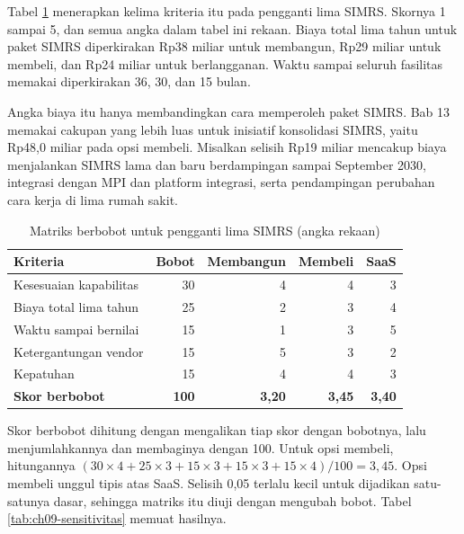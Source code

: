 Tabel \ref{tab:ch09-matriks-sumber} menerapkan kelima kriteria itu pada
pengganti lima SIMRS. Skornya 1 sampai 5, dan semua angka dalam tabel ini
rekaan. Biaya total lima tahun untuk paket SIMRS diperkirakan Rp38 miliar untuk
membangun, Rp29 miliar untuk membeli, dan Rp24 miliar untuk berlangganan. Waktu
sampai seluruh fasilitas memakai diperkirakan 36, 30, dan 15 bulan.

Angka biaya itu hanya membandingkan cara memperoleh paket SIMRS. Bab 13 memakai
cakupan yang lebih luas untuk inisiatif konsolidasi SIMRS, yaitu Rp48,0 miliar
pada opsi membeli. Misalkan selisih Rp19 miliar mencakup biaya menjalankan SIMRS lama dan
baru berdampingan sampai September 2030, integrasi dengan MPI dan platform
integrasi, serta pendampingan perubahan cara kerja di lima rumah sakit.

\begin{table}[!htb]
  \centering
  \caption{Matriks berbobot untuk pengganti lima SIMRS (angka rekaan)}
  \label{tab:ch09-matriks-sumber}
  \small
  \begin{tabularx}{\textwidth}{Xrrrr}
    \hline
    \textbf{Kriteria} & \textbf{Bobot} & \textbf{Membangun} & \textbf{Membeli} & \textbf{SaaS} \\
    \hline
    Kesesuaian kapabilitas & 30 & 4 & 4 & 3 \\
    \hline
    Biaya total lima tahun & 25 & 2 & 3 & 4 \\
    \hline
    Waktu sampai bernilai & 15 & 1 & 3 & 5 \\
    \hline
    Ketergantungan vendor & 15 & 5 & 3 & 2 \\
    \hline
    Kepatuhan & 15 & 4 & 4 & 3 \\
    \hline
    \textbf{Skor berbobot} & \textbf{100} & \textbf{3,20} & \textbf{3,45} & \textbf{3,40} \\
    \hline
  \end{tabularx}
\end{table}

Skor berbobot dihitung dengan mengalikan tiap skor dengan bobotnya, lalu
menjumlahkannya dan membaginya dengan 100. Untuk opsi membeli, hitungannya
$(30 \times 4 + 25 \times 3 + 15 \times 3 + 15 \times 3 + 15 \times 4) / 100
= 3{,}45$. Opsi membeli unggul tipis atas SaaS. Selisih 0,05 terlalu kecil
untuk dijadikan satu-satunya dasar, sehingga matriks itu diuji dengan
mengubah bobot. Tabel \ref{tab:ch09-sensitivitas} memuat hasilnya.

